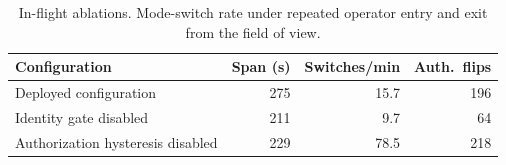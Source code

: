 \begin{table}[t]
\caption{In-flight ablations. Mode-switch rate under repeated operator entry and exit from the field of view.}
\label{tab:ablation}
\centering
\begin{tabular}{lrrr}
\toprule
Configuration & Span (s) & Switches/min & Auth.\ flips \\
\midrule
Deployed configuration & 275 & 15.7 & 196 \\
Identity gate disabled & 211 & 9.7 & 64 \\
Authorization hysteresis disabled & 229 & 78.5 & 218 \\
\bottomrule
\end{tabular}
\end{table}

